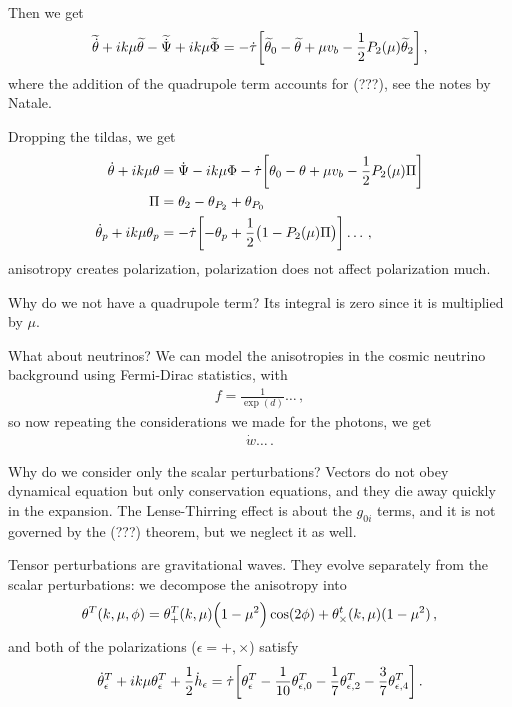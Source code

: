 \documentclass[main.tex]{subfiles}
\begin{document}
Then we get 
%
\begin{align}
\widetilde{\dot{\theta}} + ik \mu \widetilde{\theta} - \widetilde{\dot{\Psi}}
+ ik \mu \widetilde{\Phi} =
-\dot{\tau} \qty[\widetilde{\theta}_{0} - \widetilde{\theta} 
+ \mu v_b - \frac{1}{2} P_2 (\mu ) \widetilde{\theta}_{2}] 
\,,
\end{align}
%
where the addition of the quadrupole term accounts for (???), see the notes by Natale. 

Dropping the tildas, we get 
%
\begin{align}
\dot{\theta} + ik \mu \theta &= \dot{\Psi} - ik \mu \Phi - \dot{\tau} \qty[\theta_0 - \theta + \mu v_b - \frac{1}{2} P_2 (\mu ) \Pi ]  \\
\Pi &= \theta_2 - \theta_{P_2 } + \theta_{P_0 }  \\
\dot{\theta}_{p} + i k \mu \theta_{p} &= - \dot{\tau} \qty[- \theta_{p} + \frac{1}{2} \qty(1 - P_2 (\mu ) \Pi )] \dots
\,,
\end{align}
%
anisotropy creates polarization, polarization does not affect polarization much. 

Why do we not have a quadrupole term? Its integral is zero since it is multiplied by \(\mu \). 

What about neutrinos? 
We can model the anisotropies in the cosmic neutrino background using Fermi-Dirac statistics, with 
%
\begin{align}
f = \frac{1}{\exp(d)} \dots
\,,
\end{align}
%
so now repeating the considerations we made for the photons, we get 
%
\begin{align}
\dot{w} \dots
\,.
\end{align}

Why do we consider only the scalar perturbations? Vectors do not obey dynamical equation but only conservation equations, and they die away quickly in the expansion. 
The Lense-Thirring effect is about the \(g_{0i}\) terms, and it is not governed by the (???) theorem, but we neglect it as well. 

Tensor perturbations are gravitational waves. 
They evolve separately from the scalar perturbations: we decompose the anisotropy into 
%
\begin{align}
\theta^{T} (k, \mu, \phi ) = \theta^{T}_{+} (k, \mu ) \qty(1 - \mu^2) \cos( 2 \phi ) + \theta^{t}_{ \times } (k, \mu ) (1-\mu^2)
\,,
\end{align}
%
and both of the polarizations (\(\epsilon = +, \times \)) satisfy 
%
\begin{align}
\dot{\theta}^{T}_{\epsilon } + ik \mu \theta^{T}_{\epsilon } + \frac{1}{2} \dot{h}_{\epsilon } = \dot{\tau} \qty[
\theta^{T}_{\epsilon } - \frac{1}{10} \theta^{T}_{\epsilon, 0} - \frac{1}{7} \theta^{T}_{ \epsilon , 2} - \frac{3}{7} \theta^{T}_{\epsilon , 4}]
\,.
\end{align}
\end{document}
